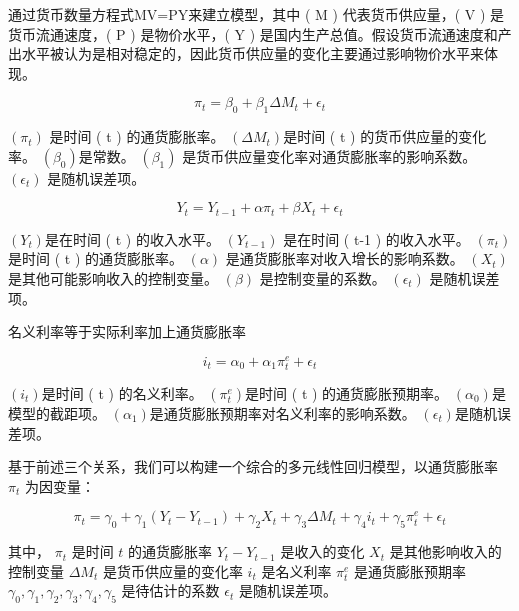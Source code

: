 
通过货币数量方程式MV=PY来建立模型，其中 ( M ) 代表货币供应量，( V ) 是货币流通速度，( P ) 是物价水平，( Y ) 是国内生产总值。假设货币流通速度和产出水平被认为是相对稳定的，因此货币供应量的变化主要通过影响物价水平来体现。

\begin{equation}
	\pi_t = \beta_0 + \beta_1 \Delta M_t + \epsilon_t
\end{equation}

$( \pi_t )$ 是时间 ( t ) 的通货膨胀率。
$( \Delta M_t )$是时间 ( t ) 的货币供应量的变化率。
$( \beta_0 )$是常数。
$( \beta_1 )$ 是货币供应量变化率对通货膨胀率的影响系数。
$( \epsilon_t )$ 是随机误差项。

\begin{equation}
	Y_t = Y_{t-1} + \alpha \pi_t + \beta X_t + \epsilon_t 
\end{equation}

$( Y_t )$是在时间 ( t ) 的收入水平。
$( Y_{t-1} )$ 是在时间 ( t-1 ) 的收入水平。
$( \pi_t )$ 是时间 ( t ) 的通货膨胀率。
$( \alpha )$ 是通货膨胀率对收入增长的影响系数。
$( X_t )$ 是其他可能影响收入的控制变量。
$( \beta )$ 是控制变量的系数。
$( \epsilon_t )$ 是随机误差项。


名义利率等于实际利率加上通货膨胀率

\begin{equation}
	i_t = \alpha_0 + \alpha_1 \pi_t^e + \epsilon_t
\end{equation}

$(i_t )$是时间 ( t ) 的名义利率。
$( \pi_t^e )$是时间 ( t ) 的通货膨胀预期率。
$( \alpha_0 )$是模型的截距项。
$( \alpha_1 )$是通货膨胀预期率对名义利率的影响系数。
$( \epsilon_t )$是随机误差项。


基于前述三个关系，我们可以构建一个综合的多元线性回归模型，以通货膨胀率 $\pi_t$ 为因变量：

\begin{equation}
\pi_t = \gamma_0 + \gamma_1 (Y_t - Y_{t-1}) + \gamma_2 X_t + \gamma_3 \Delta M_t + \gamma_4 i_t + \gamma_5 \pi_t^e + \epsilon_t
\end{equation}

其中，
$\pi_t$ 是时间 $t$ 的通货膨胀率
$Y_t - Y_{t-1}$ 是收入的变化
$X_t$ 是其他影响收入的控制变量
$\Delta M_t$ 是货币供应量的变化率
$i_t$ 是名义利率
$\pi_t^e$ 是通货膨胀预期率
$\gamma_0, \gamma_1, \gamma_2, \gamma_3, \gamma_4, \gamma_5$ 是待估计的系数
$\epsilon_t$ 是随机误差项。

